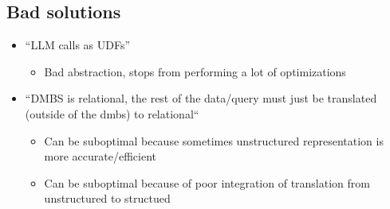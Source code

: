 \subsection{Bad solutions}
\begin{itemize}
\item “LLM calls as UDFs” 
\begin{itemize}
    \item Bad abstraction, stops from performing a lot of optimizations 
\end{itemize}
\item “DMBS is relational, the rest of the data/query must just be translated (outside of the dmbs) to relational“
\begin{itemize}
    \item Can be suboptimal because sometimes unstructured representation is more accurate/efficient
    \item Can be suboptimal because of poor integration of translation from unstructured to structued
\end{itemize}
\end{itemize}